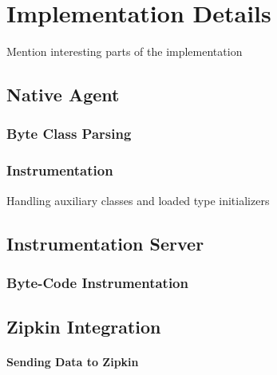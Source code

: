 \chapter{Implementation Details}
Mention interesting parts of the implementation
\section{Native Agent}
\subsection{Byte Class Parsing}
\subsection{Instrumentation}
Handling auxiliary classes and loaded type initializers
\section{Instrumentation Server}
\subsection{Byte-Code Instrumentation}
\section{Zipkin Integration}
\subsubsection{Sending Data to Zipkin}

